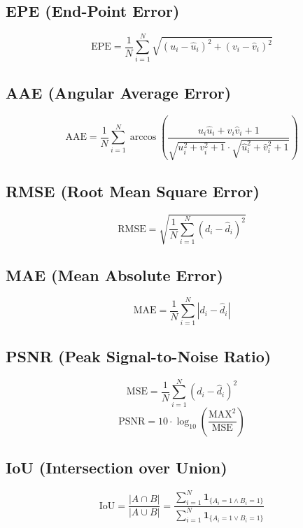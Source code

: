 \documentclass[14pt, a4paper]{extarticle}
\numberwithin{equation}{section}
\begin{document}
\subsection{EPE (End-Point Error)}
\begin{equation}
\boxed{\text{EPE} = \frac{1}{N} \sum_{i=1}^N \sqrt{(u_i - \hat{u}_i)^2 + (v_i - \hat{v}_i)^2}} \tag{63}
\end{equation}

\subsection{AAE (Angular Average Error)}
\begin{equation}
\boxed{\text{AAE} = \frac{1}{N} \sum_{i=1}^N \arccos\left( \frac{u_i \hat{u}_i + v_i \hat{v}_i + 1}{\sqrt{u_i^2 + v_i^2 + 1} \cdot \sqrt{\hat{u}_i^2 + \hat{v}_i^2 + 1}} \right)} \tag{64}
\end{equation}

\subsection{RMSE (Root Mean Square Error)}
\begin{equation}
\boxed{\text{RMSE} = \sqrt{\frac{1}{N} \sum_{i=1}^N (d_i - \hat{d}_i)^2}} \tag{65}
\end{equation}

\subsection{MAE (Mean Absolute Error)}
\begin{equation}
\boxed{\text{MAE} = \frac{1}{N} \sum_{i=1}^N |d_i - \hat{d}_i|} \tag{66}
\end{equation}

\subsection{PSNR (Peak Signal-to-Noise Ratio)}
\begin{equation}
\boxed{\text{MSE} = \frac{1}{N} \sum_{i=1}^N (d_i - \hat{d}_i)^2} \tag{67}
\end{equation}
\begin{equation}
\boxed{\text{PSNR} = 10 \cdot \log_{10}\left( \frac{\text{MAX}^2}{\text{MSE}} \right)} \tag{68}
\end{equation}

\subsection{IoU (Intersection over Union)}
\begin{equation}
\boxed{\text{IoU} = \frac{|A \cap B|}{|A \cup B|} = \frac{\sum_{i=1}^N \mathbf{1}_{\{A_i=1 \land B_i=1\}}}{\sum_{i=1}^N \mathbf{1}_{\{A_i=1 \lor B_i=1\}}}} \tag{69}
\end{equation}
\end{document}
